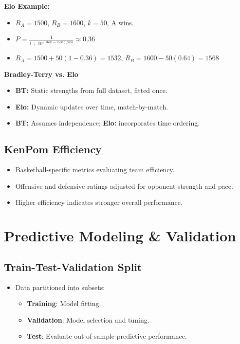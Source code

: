 \documentclass[10pt, landscape]{article}
\begin{document}
\begin{multicols}{3}
\textbf{Elo Example:}
\begin{itemize}[noitemsep]
    \item \(R_A = 1500\), \(R_B = 1600\), \(k = 50\), A wins.
    \item \(P = \frac{1}{1 + 10^{(1600-1500)/400}} \approx 0.36\)
    \item \(R_A = 1500 + 50(1 - 0.36) = 1532\), \(R_B = 1600 - 50(0.64) = 1568\)
\end{itemize}

\vspace{0.3em}
\textbf{Bradley-Terry vs. Elo}
\begin{itemize}[noitemsep]
    \item \textbf{BT:} Static strengths from full dataset, fitted once.
    \item \textbf{Elo:} Dynamic updates over time, match-by-match.
    \item \textbf{BT:} Assumes independence; \textbf{Elo:} incorporates time ordering.
\end{itemize}

\subsection{KenPom Efficiency}
\begin{itemize}[noitemsep]
    \item Basketball-specific metrics evaluating team efficiency.
    \item Offensive and defensive ratings adjusted for opponent strength and pace.
    \item Higher efficiency indicates stronger overall performance.
\end{itemize}


\section{Predictive Modeling \& Validation}

\subsection{Train-Test-Validation Split}
\begin{itemize}[noitemsep]
    \item Data partitioned into subsets:
    \begin{itemize}[noitemsep]
        \item \textbf{Training}: Model fitting.
        \item \textbf{Validation}: Model selection and tuning.
        \item \textbf{Test}: Evaluate out-of-sample predictive performance.
    \end{itemize}
\end{itemize}


\end{multicols}
\end{document}
